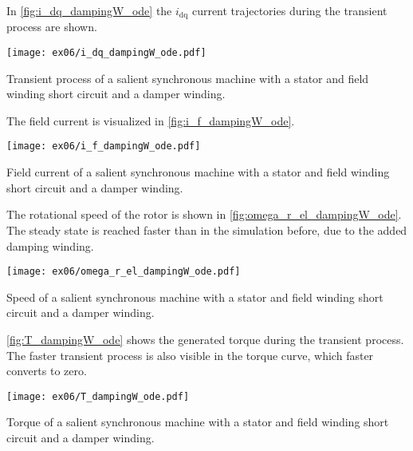 \begin{solutionblock}
    In \autoref{fig:i_dq_dampingW_ode} the $i_{\mathrm{dq}}$ current trajectories during the transient process are shown.
    \begin{solutionfigure}[h]
        \centering
        \texttt{[image: ex06/i\_dq\_dampingW\_ode.pdf]}
        \caption{Transient process of a salient synchronous machine with a stator and field winding short circuit and a damper winding.}
        \label{fig:i_dq_dampingW_ode}
    \end{solutionfigure}

    The field current is visualized in \autoref{fig:i_f_dampingW_ode}.
    \begin{solutionfigure}[h]
        \centering
        \texttt{[image: ex06/i\_f\_dampingW\_ode.pdf]}
        \caption{Field current of a salient synchronous machine with a stator and field winding short circuit and a damper winding.}
        \label{fig:i_f_dampingW_ode}
    \end{solutionfigure}

    The rotational speed of the rotor is shown in \autoref{fig:omega_r_el_dampingW_ode}. The steady state is reached faster than in the simulation before, due to the added damping winding.
    \begin{solutionfigure}[h]
        \centering
        \texttt{[image: ex06/omega\_r\_el\_dampingW\_ode.pdf]}
        \caption{Speed of a salient synchronous machine with a stator and field winding short circuit and a damper winding.}
        \label{fig:omega_r_el_dampingW_ode}
    \end{solutionfigure}

    \autoref{fig:T_dampingW_ode} shows the generated torque during the transient process. The faster transient process is also visible in the torque curve, which faster converts to zero.
    \begin{solutionfigure}[h]
        \centering
        \texttt{[image: ex06/T\_dampingW\_ode.pdf]}
        \caption{Torque of a salient synchronous machine with a stator and field winding short circuit and a damper winding.}
        \label{fig:T_dampingW_ode}
    \end{solutionfigure}
\end{solutionblock}
\FloatBarrier


